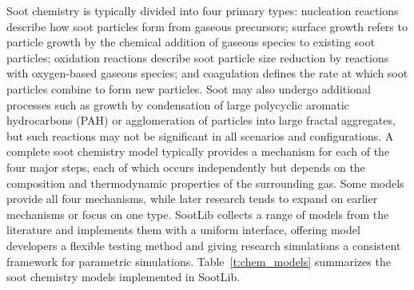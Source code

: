\documentclass[preprint,letterpaper]{elsarticle}
\begin{document}
Soot chemistry is typically divided into four primary types: nucleation reactions describe how soot particles form from gaseous precursors;
surface growth refers to particle growth by the chemical addition of gaseous species to existing soot particles; oxidation reactions describe soot particle size reduction by reactions with oxygen-based gaseous species; and coagulation defines the rate at which soot particles combine to form new particles.
Soot may also undergo additional processes such as growth by condensation of large polycyclic aromatic hydrocarbons (PAH) or agglomeration of particles into large fractal aggregates, but such reactions may not be significant in all scenarios and configurations.
A complete soot chemistry model typically provides a mechanism for each of the four major steps, each of which occurs independently but depends on the composition and thermodynamic properties of the surrounding gas. Some models provide all four mechanisms, while later research tends to expand on earlier mechanisms or focus on one type. SootLib collects a range of models from the literature and implements them with a uniform interface, offering model developers a flexible testing method and giving research simulations a consistent framework for parametric simulations. Table~\ref{t:chem_models} summarizes the soot chemistry models implemented in SootLib.
\end{document}
